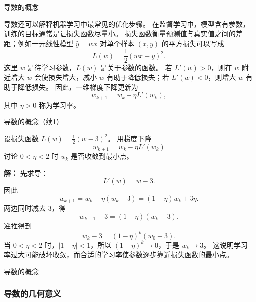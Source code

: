 \documentclass[aspectratio=169,10pt,fontset=fandol]{ctexbeamer}
\renewenvironment{solution}{\par\noindent\textbf{解：}\quad}{\par}
\begin{document}
\begin{frame}[t,fragile]{导数的概念}
\small
{\small
\begin{application}[导数与梯度下降的基本思想]
	
	导数还可以解释机器学习中最常见的优化步骤。 在监督学习中，模型含有参数，训练的目标通常是让损失函数尽量小。 损失函数衡量预测值与真实值之间的差距；例如一元线性模型 $\hat y=wx$ 对单个样本 $(x,y)$ 的平方损失可以写成
	\[
	L(w)=\frac12(wx-y)^2.
	\]
	这里 $w$ 是待学习参数，$L(w)$ 是关于参数的函数。 若 $L'(w)>0$，则在 $w$ 附近增大 $w$ 会使损失增大，减小 $w$ 有助于降低损失；若 $L'(w)<0$，则增大 $w$ 有助于降低损失。 因此，一维梯度下降更新为
	\[
	w_{k+1}=w_k-\eta L'(w_k),
	\]
	其中 $\eta>0$ 称为学习率。
	

\end{application}
}
\end{frame}
\begin{frame}[t,fragile]{导数的概念（续1）}
\footnotesize
{\footnotesize
\begin{application}[导数与梯度下降的基本思想]
	\begin{example}
		设损失函数 $L(w)=\frac12(w-3)^2$。 用梯度下降
		\[
		w_{k+1}=w_k-\eta L'(w_k)
		\]
		讨论 $0<\eta<2$ 时 $w_k$ 是否收敛到最小点。
	\end{example}
	\begin{solution}
		先求导：
		\[
		L'(w)=w-3.
		\]
		因此
		\[
		w_{k+1}=w_k-\eta(w_k-3)=(1-\eta)w_k+3\eta.
		\]
		两边同时减去 $3$，得
		\[
		w_{k+1}-3=(1-\eta)(w_k-3).
		\]
		递推得到
		\[
		w_k-3=(1-\eta)^k(w_0-3).
		\]
		当 $0<\eta<2$ 时，$|1-\eta|<1$，所以 $(1-\eta)^k\to0$，于是 $w_k\to3$。 这说明学习率过大可能破坏收敛，而合适的学习率使参数逐步靠近损失函数的最小点。
	\end{solution}
	
\end{application}
}
\end{frame}
\begin{frame}[t,fragile]{导数的概念}
\normalsize
{\normalsize

\subsubsection*{导数的几何意义}


}
\end{frame}
\end{document}
